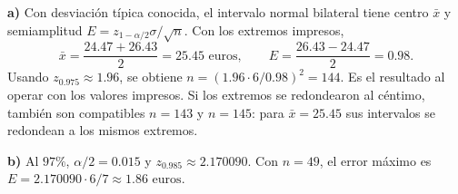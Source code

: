 \textbf{a)} Con desviación típica conocida, el intervalo normal
bilateral tiene centro $\bar x$ y semiamplitud
$E=z_{1-\alpha/2}\sigma/\sqrt n$. Con los extremos impresos,
\[
\bar x=\frac{24.47+26.43}{2}=\boxed{25.45\text{ euros}},\qquad
E=\frac{26.43-24.47}{2}=0.98.
\]
Usando $z_{0.975}\approx1.96$, se obtiene
$n=(1.96\cdot6/0.98)^2=\boxed{144}$. Es el resultado al operar
con los valores impresos. Si los extremos se redondearon al
céntimo, también son compatibles $n=143$ y $n=145$: para
$\bar x=25.45$ sus intervalos se redondean a los mismos extremos.

\textbf{b)} Al $97\%$, $\alpha/2=0.015$ y $z_{0.985}\approx2.170090$.
Con $n=49$, el error máximo es
$E=2.170090\cdot6/7\approx\boxed{1.86\text{ euros}}$.
